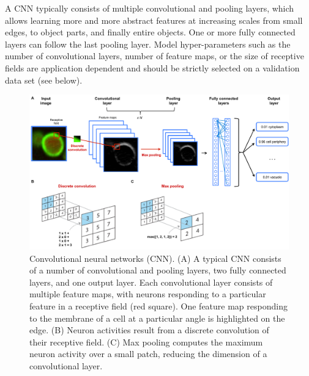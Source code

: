 A CNN typically consists of multiple convolutional and pooling layers, which allows learning more and more abstract features at increasing scales from small edges, to object parts, and finally entire objects. One or more fully connected layers can follow the last pooling layer. Model hyper-parameters such as the number of convolutional layers, number of feature maps, or the size of receptive fields are application dependent and should be strictly selected on a validation data set (see below).


\begin{figure}[htbp!]
\centering
\includegraphics[width=1.0\textwidth]{figure4}
\caption[Convolutional neural networks (CNN).]{Convolutional neural networks (CNN). (A) A typical CNN consists of a number of convolutional and pooling layers, two fully connected layers, and one output layer. Each convolutional layer consists of multiple feature maps, with neurons responding to a particular feature in a receptive field (red square). One feature map responding to the membrane of a cell at a particular angle is highlighted on the edge. (B) Neuron activities result from a discrete convolution of their receptive field. (C) Max pooling computes the maximum neuron activity over a small patch, reducing the dimension of a convolutional layer.}
\label{fig:figure4}
\end{figure}
